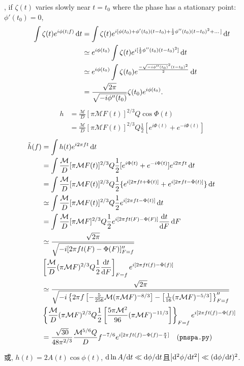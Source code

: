 \cite{Poisson1995}, if $\zeta(t)$ varies slowly near $t=t_0$ where the phase has a stationary point: $\phi'(t_0)=0$,
\begin{align}
    \int\zeta(t)e^{i\phi(t;f)}\,\mathrm{d} t&=\int\zeta(t)e^{i[\phi(t_0)+\phi'(t_0)(t-t_0)+\frac{1}{2}\phi''(t_0)(t-t_0)^2+\dots]}\,\mathrm{d} t\\
    &\simeq e^{i\phi(t_0)}\int\zeta(t)e^{i[\frac{1}{2}\phi''(t_0)(t-t_0)^2]}\,\mathrm{d} t\\
    &\simeq e^{i\phi(t_0)}\int\zeta(t_0)e^{\frac{-\sqrt{-i\phi''(t_0)}^2(t-t_0)^2}{2}}\,\mathrm{d} t\\
    &=\frac{\sqrt{2\pi}}{\sqrt{-i\phi''(t_0)}}\zeta(t_0)e^{i\phi(t_0)}.
\end{align}
\begin{align}
    h&=\frac{\mathcal{M}}{D}[\pi \mathcal{M}F(t)]^{2/3}Q\cos\Phi(t)\\
    &=\frac{\mathcal{M}}{D}[\pi \mathcal{M}F(t)]^{2/3}Q\frac{1}{2}[e^{i\Phi(t)}+e^{-i\Phi(t)}]
\end{align}
\begin{align}
    \tilde{h}(f)&=\int h(t)e^{i2\pi ft}\,\mathrm{d} t\\
    &=\int \frac{\mathcal{M}}{D}[\pi \mathcal{M}F(t)]^{2/3}Q\frac{1}{2}[e^{i\Phi(t)}+e^{-i\Phi(t)}]e^{i2\pi ft}\,\mathrm{d} t\\
    &=\int\frac{\mathcal{M}}{D}[\pi \mathcal{M}F(t)]^{2/3}Q\frac{1}{2}\{e^{i[2\pi ft+\Phi(t)]}+e^{i[2\pi ft-\Phi(t)]}\}\,\mathrm{d} t\\
    &\simeq\int\frac{\mathcal{M}}{D}[\pi \mathcal{M}F(t)]^{2/3}Q\frac{1}{2}e^{i[2\pi ft-\Phi(t)]}\,\mathrm{d} t\\
    &=\int\frac{\mathcal{M}}{D}[\pi \mathcal{M}F]^{2/3}Q\frac{1}{2}e^{i[2\pi ft(F)-\Phi(F)]}\frac{\mathrm{d} t}{\mathrm{d} F}\,\mathrm{d} F\\
    &\simeq\frac{\sqrt{2\pi}}{\sqrt{-i[2\pi ft(F)-\Phi(F)]''_{F=f}}}\\
    &\left[\frac{\mathcal{M}}{D}(\pi \mathcal{M}F)^{2/3}Q\frac{1}{2}\frac{\mathrm{d} t}{\mathrm{d} F}\right]_{F=f}e^{i[2\pi ft(f)-\Phi(f)]}\\
    &\simeq\frac{\sqrt{2\pi}}{\sqrt{-i\left\{2\pi f\left[-\frac{5}{256}\mathcal{M}(\pi \mathcal{M} F)^{-8/3}\right]-\left[\frac{1}{16}(\pi\mathcal{M} F)^{-5/3}\right]\right\}''_{F=f}}}\\
    &\left\{\frac{\mathcal{M}}{D}(\pi \mathcal{M}F)^{2/3}Q\frac{1}{2}\left[\frac{5\pi\mathcal{M}^2}{96}(\pi\mathcal{M} F)^{-11/3}\right]\right\}_{F=f}e^{i[2\pi ft(f)-\Phi(f)]}\\
    &=\frac{\sqrt{30}}{48\pi^{2/3}}\frac{\mathcal{M}^{5/6}Q}{D}f^{-7/6}e^{i[2\pi ft(f)-\Phi(f)-\frac{\pi}{4}]}\quad(\texttt{pnspa.py})
\end{align}

或\cite{Arun2005}, $h(t)=2A(t)\cos\phi(t)$, $\mathrm{d}\ln A/\mathrm{d} t\ll\mathrm{d}\phi/\mathrm{d} t$且$\left\lvert \mathrm{d}^2\phi/\mathrm{d} t^2\right\rvert \ll(\mathrm{d}\phi/\mathrm{d} t)^2$.
